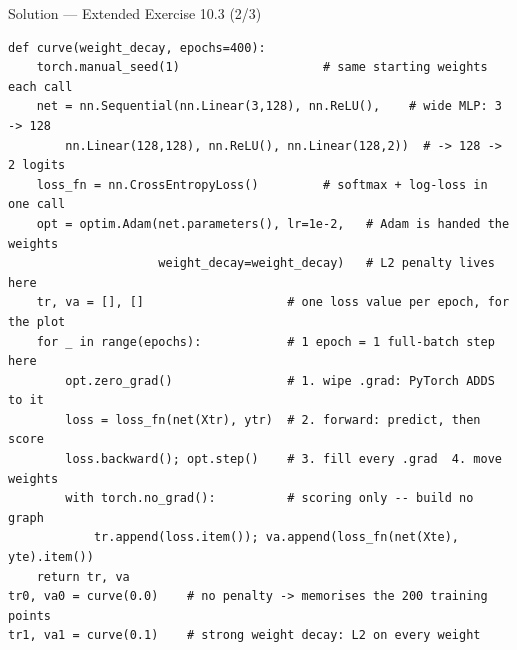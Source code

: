 \documentclass[aspectratio=169,11pt]{beamer}
\begin{document}
\begin{frame}[fragile]{Solution --- Extended Exercise 10.3 (2/3)}
\begin{solutionbox}
\begin{lstlisting}[basicstyle=\ttfamily\scriptsize\linespread{0.88}\selectfont]
def curve(weight_decay, epochs=400):
    torch.manual_seed(1)                    # same starting weights each call
    net = nn.Sequential(nn.Linear(3,128), nn.ReLU(),    # wide MLP: 3 -> 128
        nn.Linear(128,128), nn.ReLU(), nn.Linear(128,2))  # -> 128 -> 2 logits
    loss_fn = nn.CrossEntropyLoss()         # softmax + log-loss in one call
    opt = optim.Adam(net.parameters(), lr=1e-2,   # Adam is handed the weights
                     weight_decay=weight_decay)   # L2 penalty lives here
    tr, va = [], []                    # one loss value per epoch, for the plot
    for _ in range(epochs):            # 1 epoch = 1 full-batch step here
        opt.zero_grad()                # 1. wipe .grad: PyTorch ADDS to it
        loss = loss_fn(net(Xtr), ytr)  # 2. forward: predict, then score
        loss.backward(); opt.step()    # 3. fill every .grad  4. move weights
        with torch.no_grad():          # scoring only -- build no graph
            tr.append(loss.item()); va.append(loss_fn(net(Xte), yte).item())
    return tr, va
tr0, va0 = curve(0.0)    # no penalty -> memorises the 200 training points
tr1, va1 = curve(0.1)    # strong weight decay: L2 on every weight
\end{lstlisting}
\end{solutionbox}
\end{frame}
\end{document}
